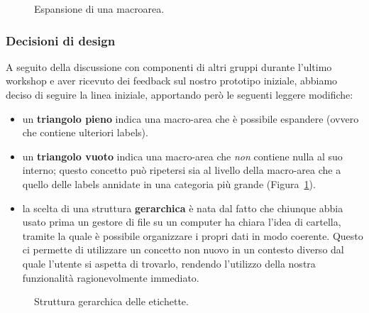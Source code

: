 \documentclass[12pt]{article} %
\begin{document}
\begin{figure}[H]
\caption{Espansione di una macroarea.}
\label{fig:low_prototype}
\end{figure}

\subsubsection{Decisioni di design}
A seguito della discussione con componenti di altri gruppi durante l'ultimo workshop e aver ricevuto dei feedback sul nostro prototipo iniziale, abbiamo deciso di seguire la linea iniziale, apportando per\`o le seguenti leggere modifiche:
\begin{itemize}
\item un \textbf{triangolo pieno} indica una macro-area che \`e possibile espandere (ovvero che contiene ulteriori labels).
\item un \textbf{triangolo vuoto} indica una macro-area che \emph{non} contiene nulla al suo interno; questo concetto pu\`o ripetersi sia al livello della macro-area che a quello delle labels annidate in una categoria pi\`u grande (Figura~\ref{fig:low_prototype}).
\item la scelta di una struttura \textbf{gerarchica} \`e nata dal fatto che chiunque abbia usato prima un gestore di file su un computer ha chiara l'idea di cartella, tramite la quale \`e possibile organizzare i propri dati in modo coerente. Questo ci permette di utilizzare un concetto non nuovo in un contesto diverso dal quale l'utente si aspetta di trovarlo, rendendo l'utilizzo della nostra funzionalit\`a ragionevolmente immediato.
\end{itemize}

\begin{figure}[H]
\caption{Struttura gerarchica delle etichette.}
\label{fig:low_prototype2}
\end{figure}
\end{document}
